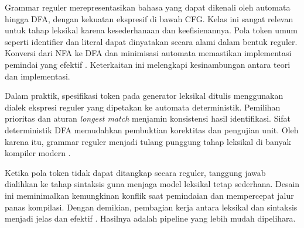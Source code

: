\documentclass[../main.tex]{subfiles}
\begin{document}
Grammar reguler merepresentasikan bahasa yang dapat dikenali oleh automata hingga DFA, dengan kekuatan ekspresif di bawah CFG. Kelas ini sangat relevan untuk tahap leksikal karena kesederhanaan dan keefisienannya. Pola token umum seperti identifier dan literal dapat dinyatakan secara alami dalam bentuk reguler. Konversi dari NFA ke DFA dan minimisasi automata memastikan implementasi pemindai yang efektif \citep{WikiRegex,WikiNFA,WikiDFA,WikiDFAMin}. Keterkaitan ini melengkapi kesinambungan antara teori dan implementasi.

Dalam praktik, spesifikasi token pada generator leksikal ditulis menggunakan dialek ekspresi reguler yang dipetakan ke automata deterministik. Pemilihan prioritas dan aturan \emph{longest match} menjamin konsistensi hasil identifikasi. Sifat deterministik DFA memudahkan pembuktian korektitas dan pengujian unit. Oleh karena itu, grammar reguler menjadi tulang punggung tahap leksikal di banyak kompiler modern \citep{FlexManual}.


Ketika pola token tidak dapat ditangkap secara reguler, tanggung jawab dialihkan ke tahap sintaksis guna menjaga model leksikal tetap sederhana. Desain ini meminimalkan kemungkinan konflik saat pemindaian dan mempercepat jalur panas kompilasi. Dengan demikian, pembagian kerja antara leksikal dan sintaksis menjadi jelas dan efektif \citep{WikiRegex}. Hasilnya adalah pipeline yang lebih mudah dipelihara.
\end{document}
